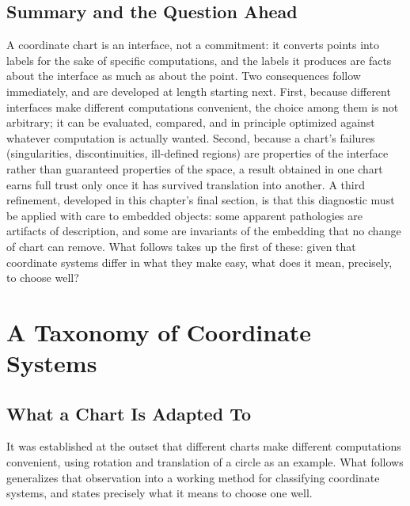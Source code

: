 \documentclass[11pt,fleqn]{book}
\numberwithin{equation}{chapter}
\theoremstyle{plain}
\theoremstyle{definition}
\theoremstyle{remark}
\providecommand{\enquote}[1]{``#1''}
\begin{document}
\section{Summary and the Question Ahead}

A coordinate chart is an interface, not a commitment: it converts points into labels for the sake of specific computations, and the labels it produces are facts about the interface as much as about the point. Two consequences follow immediately, and are developed at length starting next. First, because different interfaces make different computations convenient, the choice among them is not arbitrary; it can be evaluated, compared, and in principle optimized against whatever computation is actually wanted. Second, because a chart's failures (singularities, discontinuities, ill-defined regions) are properties of the interface rather than guaranteed properties of the space, a result obtained in one chart earns full trust only once it has survived translation into another. A third refinement, developed in this chapter's final section, is that this diagnostic must be applied with care to embedded objects: some apparent pathologies are artifacts of description, and some are invariants of the embedding that no change of chart can remove. What follows takes up the first of these: given that coordinate systems differ in what they make easy, what does it mean, precisely, to choose well?


\providecommand{\enquote}[1]{``#1''}

\chapter{A Taxonomy of Coordinate Systems}

\section{What a Chart Is Adapted To}

It was established at the outset that different charts make different computations convenient, using rotation and translation of a circle as an example. What follows generalizes that observation into a working method for classifying coordinate systems, and states precisely what it means to choose one well.
\end{document}
